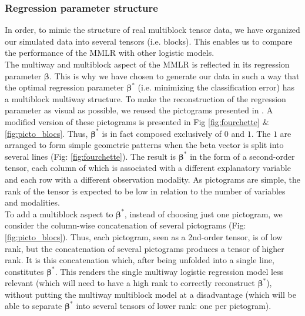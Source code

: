 \documentclass[preprint,12pt]{elsarticle}
\begin{document}
\subsubsection{Regression parameter structure}

\noindent In order, to mimic the structure of real multiblock tensor data, we have organized our simulated data into several tensors (i.e. blocks). This enables us to compare the performance of the MMLR with other logistic models.\\
\indent The multiway and multiblock aspect of the MMLR is reflected in its regression parameter $\bm{\beta}$. This is why we have chosen to generate our data in such a way that the optimal regression parameter $\bm{\beta}^*$ (i.e. minimizing the classification error) has a multiblock multiway structure. To make the reconstruction of the regression parameter as visual as possible, we reused the pictograms presented in \cite{picto}. A modified version of these pictograms is presented in Fig \ref{fig:fourchette} $\&$ \ref{fig:picto_blocs}. Thus, $\bm{\beta}^*$ is in fact composed exclusively of $0$ and $1$. The $1$ are arranged to form simple geometric patterns when the beta vector is split into several lines (Fig: \ref{fig:fourchette}). The result is $\bm{\beta}^*$ in the form of a second-order tensor, each column of which is associated with a different explanatory variable and each row with a different observation modality. As pictograms are simple, the rank of the tensor is expected to be low in relation to the number of variables and modalities.\\
\indent To add a multiblock aspect to $\bm{\beta}^*$, instead of choosing just one pictogram, we consider the column-wise concatenation of several pictograms (Fig: \ref{fig:picto_blocs}). Thus, each pictogram, seen as a 2nd-order tensor, is of low rank, but the concatenation of several pictograms produces a tensor of higher rank. It is this concatenation which, after being unfolded into a single line, constitutes $\bm{\beta}^*$. This renders the single multiway logistic regression model less relevant (which will need to have a high rank to correctly reconstruct $\bm{\beta}^*$), without putting the multiway multiblock model at a disadvantage (which will be able to separate $\bm{\beta}^*$ into several tensors of lower rank: one per pictogram).
\end{document}
